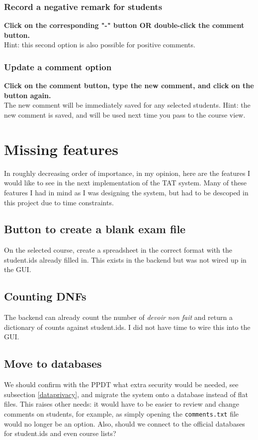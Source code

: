 \documentclass[10pt]{article}
\begin{document}
\subsubsection{Record a negative remark for students}
\textbf{Click on the corresponding "-" button OR double-click the comment button.} \\
Hint: this second option is also possible for positive comments.

\subsubsection{Update a comment option}
\textbf{Click on the comment button, type the new comment, and click on the button again.} \\
The new comment will be immediately saved for any selected students. 
Hint: the new comment is saved, and will be used next time you pass to the course view.





\section{Missing features} \label{notdone} 

In roughly decreasing order of importance, in my opinion, here are the features I would like to see in the next implementation of the TAT system. Many of these features I had in mind as I was designing the system, but had to be descoped in this project due to time constraints.

\subsection{Button to create a blank exam file}
On the selected course, create a spreadsheet in the correct format with the student.ids already filled in. This exists in the backend but was not wired up in the GUI.

\subsection{Counting DNFs}
The backend can already count the number of \emph{devoir non fait} and return a dictionary of counts against student.ids. I did not have time to wire this into the GUI.

\subsection{Move to databases}
We should confirm with the PPDT what extra security would be needed, see subsection \ref{dataprivacy}, and migrate the system onto a database instead of flat files. This raises other needs: it would have to be easier to review and change comments on students, for example, as simply opening the \texttt{comments.txt} file would no longer be an option. Also, should we connect to the official databases for student.ids and even course lists?
\end{document}
